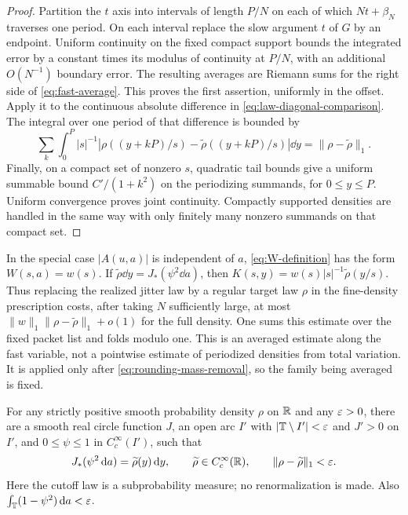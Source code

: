 \begin{proof}
Partition the $t$ axis into intervals of length $P/N$ on each of
which $Nt+\beta_N$ traverses one period. On each interval replace
the slow argument $t$ of $G$ by an endpoint. Uniform continuity on
the fixed compact support bounds the integrated error by a constant
times its modulus of continuity at $P/N$, with an additional
$O(N^{-1})$ boundary error. The resulting averages are Riemann sums
for the right side of \eqref{eq:fast-average}. This proves the first
assertion, uniformly in the offset. Apply it to the continuous
absolute difference in \eqref{eq:law-diagonal-comparison}.
The integral over one period of that difference is bounded by
\[
 \sum_k\int_0^P |s|^{-1}
       |\rho((y+kP)/s)-\widetilde\rho((y+kP)/s)|\dd y
       =\|\rho-\widetilde\rho\|_1.
\]
Finally, on a compact set of nonzero $s$, quadratic tail bounds give
a uniform summable bound $C'/(1+k^2)$ on the periodizing summands,
for $0\le y\le P$. Uniform convergence proves joint continuity.
Compactly supported densities are handled in the same way with
only finitely many nonzero summands on that compact set.
\end{proof}

In the special case $|A(u,a)|$ is independent of $a$,
\eqref{eq:W-definition} has the form $W(s,a)=w(s)$.
If $\widetilde\rho\dd y=J_*(\psi^2\dd a)$, then
$K(s,y)=w(s)|s|^{-1}\widetilde\rho(y/s)$. Thus replacing the
realized jitter law by a regular target law $\rho$ in the
fine-density prescription costs, after taking $N$ sufficiently
large, at most
$\|w\|_1\|\rho-\widetilde\rho\|_1+o(1)$ for the full density.
One sums this estimate over the fixed packet list and folds modulo
one. This is an averaged estimate along the fast variable, not a
pointwise estimate of periodized densities from total variation.
It is applied only after \eqref{eq:rounding-mass-removal}, so the
family being averaged is fixed.

\begin{lemma}\label{lem:law-approx}
For any strictly positive smooth probability density $\rho$ on
$\mathbb R$ and any $\varepsilon>0$, there are a smooth real circle function $J$,
an open arc $I'$ with $|\mathbb T\setminus I'|<\varepsilon$ and $J'>0$ on $I'$,
and $0\le\psi\le1$ in $C_c^\infty(I')$, such that
\[
 J_*(\psi^2\,\mathrm d a)=\widetilde\rho(y)\,\mathrm d y,
 \qquad \widetilde\rho\in C_c^\infty(\mathbb R),
 \qquad \|\rho-\widetilde\rho\|_1<\varepsilon.
\]
Here the cutoff law is a subprobability measure; no renormalization
is made. Also $\int_\mathbb T(1-\psi^2)\,\mathrm d a<\varepsilon$.
\end{lemma}

